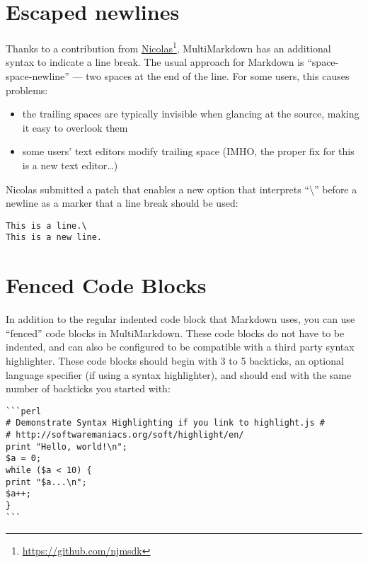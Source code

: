 \section{Escaped newlines}
\label{escapednewlines}

Thanks to a contribution from \href{https://github.com/njmsdk}{Nicolas}\footnote{\href{https://github.com/njmsdk}{https:\slash{}\slash{}github.com\slash{}njmsdk}}, MultiMarkdown has an additional syntax to indicate a line break. The usual approach for Markdown is ``space-space-newline'' --- two spaces at the end of the line. For some users, this causes problems:

\begin{itemize}
\item the trailing spaces are typically invisible when glancing at the source, making it easy to overlook them

\item some users' text editors modify trailing space (IMHO, the proper fix for this is a new text editor{\ldots})

\end{itemize}

Nicolas submitted a patch that enables a new option that interprets ``\textbackslash{}'' before a newline as a marker that a line break should be used:

\begin{verbatim}
This is a line.\
This is a new line.
\end{verbatim}

\section{Fenced Code Blocks}
\label{fencedcodeblocks}

In addition to the regular indented code block that Markdown uses, you can use ``fenced'' code blocks in MultiMarkdown. These code blocks do not have to be indented, and can also be configured to be compatible with a third party syntax highlighter. These code blocks should begin with 3 to 5 backticks, an optional language specifier (if using a syntax highlighter), and should end with the same number of backticks you started with:

\begin{verbatim}
```perl
# Demonstrate Syntax Highlighting if you link to highlight.js #
# http://softwaremaniacs.org/soft/highlight/en/
print "Hello, world!\n";
$a = 0;
while ($a < 10) {
print "$a...\n";
$a++;
}
```
\end{verbatim}

